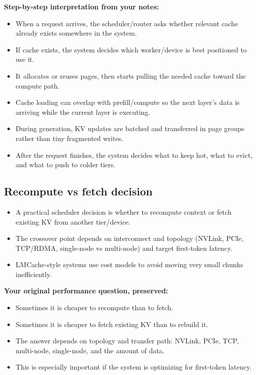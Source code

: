 \documentclass[11pt]{article}
\begin{document}
\textbf{Step-by-step interpretation from your notes:}
\begin{itemize}[leftmargin=1.2em]
\item When a request arrives, the scheduler/router asks whether relevant cache already exists somewhere in the system.
\item If cache exists, the system decides which worker/device is best positioned to use it.
\item It allocates or reuses pages, then starts pulling the needed cache toward the compute path.
\item Cache loading can overlap with prefill/compute so the next layer's data is arriving while the current layer is executing.
\item During generation, KV updates are batched and transferred in page groups rather than tiny fragmented writes.
\item After the request finishes, the system decides what to keep hot, what to evict, and what to push to colder tiers.
\end{itemize}

\subsection{Recompute vs fetch decision}
\begin{itemize}[leftmargin=1.2em]
\item A practical scheduler decision is whether to recompute context or fetch existing KV from another tier/device.
\item The crossover point depends on interconnect and topology (NVLink, PCIe, TCP/RDMA, single-node vs multi-node) and target first-token latency.
\item LMCache-style systems use cost models to avoid moving very small chunks inefficiently.
\end{itemize}

\textbf{Your original performance question, preserved:}
\begin{itemize}[leftmargin=1.2em]
\item Sometimes it is cheaper to recompute than to fetch.
\item Sometimes it is cheaper to fetch existing KV than to rebuild it.
\item The answer depends on topology and transfer path: NVLink, PCIe, TCP, multi-node, single-node, and the amount of data.
\item This is especially important if the system is optimizing for first-token latency.
\end{itemize}
\end{document}
